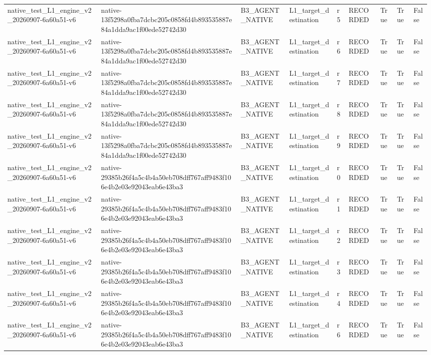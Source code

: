 \begin{tabular}{lllllllll}
native\_test\_L1\_engine\_v2\_20260907-6a60a51-v6 & native-13f5298a0fba7dcbc205c0858fd4b893535887e84a1dda9ac1f00ede52742d30 & B3\_AGENT\_NATIVE & L1\_target\_destination & r5 & RECORDED & True & True & False \\
native\_test\_L1\_engine\_v2\_20260907-6a60a51-v6 & native-13f5298a0fba7dcbc205c0858fd4b893535887e84a1dda9ac1f00ede52742d30 & B3\_AGENT\_NATIVE & L1\_target\_destination & r6 & RECORDED & True & True & False \\
native\_test\_L1\_engine\_v2\_20260907-6a60a51-v6 & native-13f5298a0fba7dcbc205c0858fd4b893535887e84a1dda9ac1f00ede52742d30 & B3\_AGENT\_NATIVE & L1\_target\_destination & r7 & RECORDED & True & True & False \\
native\_test\_L1\_engine\_v2\_20260907-6a60a51-v6 & native-13f5298a0fba7dcbc205c0858fd4b893535887e84a1dda9ac1f00ede52742d30 & B3\_AGENT\_NATIVE & L1\_target\_destination & r8 & RECORDED & True & True & False \\
native\_test\_L1\_engine\_v2\_20260907-6a60a51-v6 & native-13f5298a0fba7dcbc205c0858fd4b893535887e84a1dda9ac1f00ede52742d30 & B3\_AGENT\_NATIVE & L1\_target\_destination & r9 & RECORDED & True & True & False \\
native\_test\_L1\_engine\_v2\_20260907-6a60a51-v6 & native-29385b26f4a5c4b4a50eb708dff767aff9483f106e4b2e03e92043eab6e43ba3 & B3\_AGENT\_NATIVE & L1\_target\_destination & r0 & RECORDED & True & True & False \\
native\_test\_L1\_engine\_v2\_20260907-6a60a51-v6 & native-29385b26f4a5c4b4a50eb708dff767aff9483f106e4b2e03e92043eab6e43ba3 & B3\_AGENT\_NATIVE & L1\_target\_destination & r1 & RECORDED & True & True & False \\
native\_test\_L1\_engine\_v2\_20260907-6a60a51-v6 & native-29385b26f4a5c4b4a50eb708dff767aff9483f106e4b2e03e92043eab6e43ba3 & B3\_AGENT\_NATIVE & L1\_target\_destination & r2 & RECORDED & True & True & False \\
native\_test\_L1\_engine\_v2\_20260907-6a60a51-v6 & native-29385b26f4a5c4b4a50eb708dff767aff9483f106e4b2e03e92043eab6e43ba3 & B3\_AGENT\_NATIVE & L1\_target\_destination & r3 & RECORDED & True & True & False \\
native\_test\_L1\_engine\_v2\_20260907-6a60a51-v6 & native-29385b26f4a5c4b4a50eb708dff767aff9483f106e4b2e03e92043eab6e43ba3 & B3\_AGENT\_NATIVE & L1\_target\_destination & r4 & RECORDED & True & True & False \\
native\_test\_L1\_engine\_v2\_20260907-6a60a51-v6 & native-29385b26f4a5c4b4a50eb708dff767aff9483f106e4b2e03e92043eab6e43ba3 & B3\_AGENT\_NATIVE & L1\_target\_destination & r6 & RECORDED & True & True & False \\

\end{tabular}
